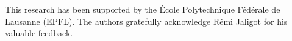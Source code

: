 \begin{acknowledgements}
  This research has been supported by the \'Ecole Polytechnique F\'ed\'erale de Lausanne (EPFL).
  The authors gratefully acknowledge R\'emi Jaligot for his valuable feedback.
\end{acknowledgements}


%
%




